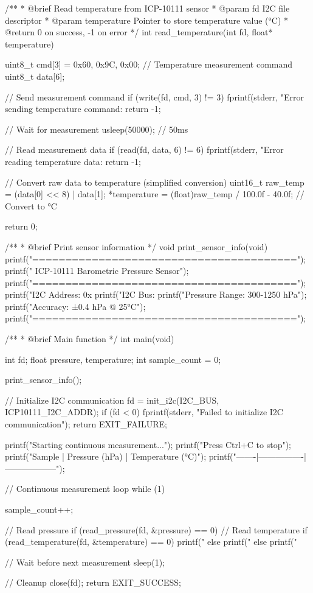 \documentclass[11pt,a4paper]{article}
\begin{document}
/**
 * @brief Read temperature from ICP-10111 sensor
 * @param fd I2C file descriptor
 * @param temperature Pointer to store temperature value (°C)
 * @return 0 on success, -1 on error
 */
int read_temperature(int fd, float* temperature) {
    uint8_t cmd[3] = {0x60, 0x9C, 0x00}; // Temperature measurement command
    uint8_t data[6];
    
    // Send measurement command
    if (write(fd, cmd, 3) != 3) {
        fprintf(stderr, "Error sending temperature command: %
        return -1;
    }
    
    // Wait for measurement
    usleep(50000); // 50ms
    
    // Read measurement data
    if (read(fd, data, 6) != 6) {
        fprintf(stderr, "Error reading temperature data: %
        return -1;
    }
    
    // Convert raw data to temperature (simplified conversion)
    uint16_t raw_temp = (data[0] << 8) | data[1];
    *temperature = (float)raw_temp / 100.0f - 40.0f; // Convert to °C
    
    return 0;
}

/**
 * @brief Print sensor information
 */
void print_sensor_info(void) {
    printf("========================================\n");
    printf("  ICP-10111 Barometric Pressure Sensor\n");
    printf("========================================\n");
    printf("I2C Address: 0x%
    printf("I2C Bus: %
    printf("Pressure Range: 300-1250 hPa\n");
    printf("Accuracy: ±0.4 hPa @ 25°C\n");
    printf("========================================\n\n");
}

/**
 * @brief Main function
 */
int main(void) {
    int fd;
    float pressure, temperature;
    int sample_count = 0;
    
    print_sensor_info();
    
    // Initialize I2C communication
    fd = init_i2c(I2C_BUS, ICP10111_I2C_ADDR);
    if (fd < 0) {
        fprintf(stderr, "Failed to initialize I2C communication\n");
        return EXIT_FAILURE;
    }
    
    printf("Starting continuous measurement...\n");
    printf("Press Ctrl+C to stop\n\n");
    printf("Sample | Pressure (hPa) | Temperature (°C)\n");
    printf("-------|----------------|------------------\n");
    
    // Continuous measurement loop
    while (1) {
        sample_count++;
        
        // Read pressure
        if (read_pressure(fd, &pressure) == 0) {
            // Read temperature
            if (read_temperature(fd, &temperature) == 0) {
                printf("%
            } else {
                printf("%
            }
        } else {
            printf("%
        }
        
        // Wait before next measurement
        sleep(1);
    }
    
    // Cleanup
    close(fd);
    return EXIT_SUCCESS;
}
\end{document}
